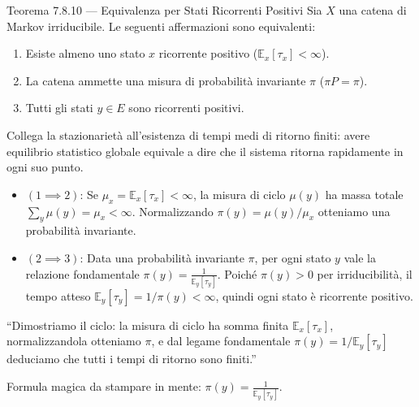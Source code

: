 \documentclass[11pt,a4paper]{report}
\begin{document}
\begin{teoremabox}{Teorema 7.8.10 --- Equivalenza per Stati Ricorrenti Positivi}
Sia $X$ una catena di Markov irriducibile. Le seguenti affermazioni sono equivalenti:
\begin{enumerate}
    \item Esiste almeno uno stato $x$ ricorrente positivo ($\mathbb{E}_x[\tau_x] < \infty$).
    \item La catena ammette una misura di probabilità invariante $\pi$ ($\pi P = \pi$).
    \item Tutti gli stati $y \in E$ sono ricorrenti positivi.
\end{enumerate}

\begin{cosafa}
Collega la stazionarietà all'esistenza di tempi medi di ritorno finiti: avere equilibrio statistico globale equivale a dire che il sistema ritorna rapidamente in ogni suo punto.
\end{cosafa}

\begin{dimostrazione}
\begin{itemize}
    \item $(1 \implies 2)$: Se $\mu_x = \mathbb{E}_x[\tau_x] < \infty$, la misura di ciclo $\mu(y)$ ha massa totale $\sum_y \mu(y) = \mu_x < \infty$. Normalizzando $\pi(y) = \mu(y)/\mu_x$ otteniamo una probabilità invariante.
    \item $(2 \implies 3)$: Data una probabilità invariante $\pi$, per ogni stato $y$ vale la relazione fondamentale $\pi(y) = \frac{1}{\mathbb{E}_y[\tau_y]}$. Poiché $\pi(y) > 0$ per irriducibilità, il tempo atteso $\mathbb{E}_y[\tau_y] = 1/\pi(y) < \infty$, quindi ogni stato è ricorrente positivo.
\end{itemize}
\end{dimostrazione}

\begin{oralbox}
``Dimostriamo il ciclo: la misura di ciclo ha somma finita $\mathbb{E}_x[\tau_x]$, normalizzandola otteniamo $\pi$, e dal legame fondamentale $\pi(y) = 1/\mathbb{E}_y[\tau_y]$ deduciamo che tutti i tempi di ritorno sono finiti.''
\end{oralbox}

\begin{tipbox}
Formula magica da stampare in mente: \textbf{$\pi(y) = \frac{1}{\mathbb{E}_y[\tau_y]}$}.
\end{tipbox}
\end{teoremabox}
\end{document}
